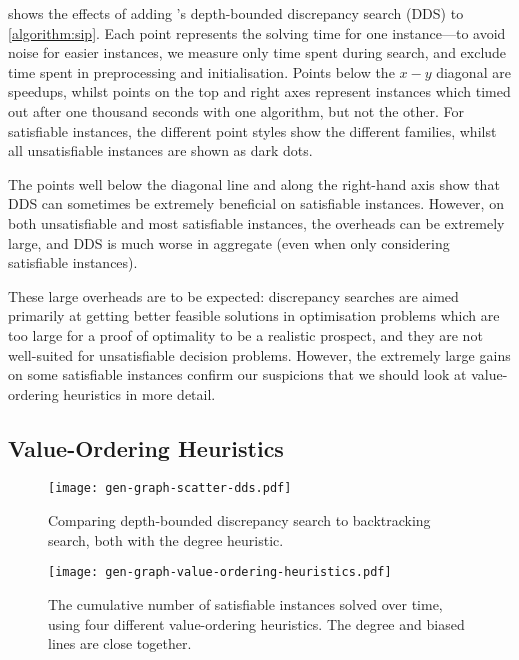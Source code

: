\documentclass{article}
\newcommand{\citepos}[1]{\citeauthor{#1}'s \shortcite{#1}}
\begin{document}
 shows the effects of adding \citepos{DBLP:conf/ijcai/Walsh97}
depth-bounded discrepancy search (DDS) to \cref{algorithm:sip}. Each point represents the solving
time for one instance---to avoid noise for easier instances, we measure only time spent during
search, and exclude time spent in preprocessing and initialisation.  Points below the $x-y$ diagonal
are speedups, whilst points on the top and right axes represent instances which timed out after one
thousand seconds with one algorithm, but not the other. For satisfiable instances, the different
point styles show the different families, whilst all unsatisfiable instances are shown as dark dots.

The points well below the diagonal line and along the right-hand axis show that DDS can sometimes be
extremely beneficial on satisfiable instances.  However, on both unsatisfiable and most satisfiable
instances, the overheads can be extremely large, and DDS is much worse in aggregate (even when only
considering satisfiable instances).

These large overheads are to be expected: discrepancy searches are aimed primarily at getting better
feasible solutions in optimisation problems which are too large for a proof of optimality to be a
realistic prospect, and they are not well-suited for unsatisfiable decision problems. However, the
extremely large gains on some satisfiable instances confirm our suspicions that we should look at
value-ordering heuristics in more detail.

\subsection{Value-Ordering Heuristics}

\begin{figure}[p]
    \centering
    \texttt{[image: gen-graph-scatter-dds.pdf]}

    \caption{Comparing depth-bounded discrepancy search to backtracking search, both with the degree
    heuristic.}\label{figure:scatter-dds}
\end{figure}

\begin{figure}[p]
    \centering
    \texttt{[image: gen-graph-value-ordering-heuristics.pdf]}

    \caption{The cumulative number of satisfiable instances solved over time, using four
    different value-ordering heuristics. The degree and biased lines are close together.}
    \label{figure:value-ordering-heuristics}
\end{figure}
\end{document}
